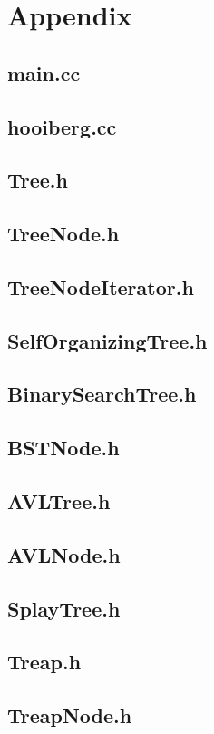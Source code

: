 \documentclass[a4paper,10pt]{article}
\begin{document}
\section{Appendix}

\subsection{main.cc}

\subsection{hooiberg.cc}

\subsection{Tree.h}

\subsection{TreeNode.h}

\subsection{TreeNodeIterator.h}

\subsection{SelfOrganizingTree.h}

\subsection{BinarySearchTree.h}

\subsection{BSTNode.h}

\subsection{AVLTree.h}

\subsection{AVLNode.h}

\subsection{SplayTree.h}

\subsection{Treap.h}

\subsection{TreapNode.h}

\end{document}
